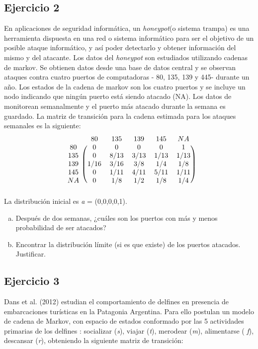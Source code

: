 \documentclass[12pt, a4paper]{article}
\begin{document}
\subsection*{Ejercicio 2}
En aplicaciones de seguridad informática, un \textit{honeypot}(o sistema trampa) es una herramienta dispuesta en una red o sistema informático para ser el objetivo de un posible ataque informático, y así poder detectarlo y obtener información del mismo y del atacante. Los datos del \textit{honeypot} son estudiados utilizando cadenas de markov. Se obtienen datos desde una base de datos central y se observan ataques contra cuatro puertos de computadoras - 80, 135, 139 y 445- durante un año. Los estados de la cadena de markov son los cuatro puertos y se incluye un nodo indicando que ningún puerto está siendo atacado (NA). Los datos de monitorean semanalmente y el puerto más atacado durante la semana es guardado. La matriz de transición para la cadena estimada para los ataques semanales es la siguiente:
 \[
\begin{blockarray}{cccccc}
 & 80 & 135 & 139 & 145 & NA \\
\begin{block}{c(ccccc)}
  80 & 0 & 0 & 0 & 0 & 1 \\
  135 & 0 & 8/13 & 3/13 & 1/13 & 1/13 \\
  139 & 1/16 & 3/16 & 3/8 & 1/4 & 1/8 \\
  145 & 0 & 1/11 & 4/11 & 5/11 & 1/11 \\
  NA & 0 & 1/8 & 1/2 & 1/8 & 1/4 \\
\end{block}
\end{blockarray}
 \]
La distribución inicial es \textit{a} =  (0,0,0,0,1).

\begin{enumerate}[(a)]
	\item Después de dos semanas, ¿cuáles son los puertos con más y menos probabilidad de ser atacados?
	\item Encontrar la distribución límite (si es que existe) de los puertos atacados. Justificar.
\end{enumerate}

\subsection*{Ejercicio 3}
Dans et al. (2012) estudian el comportamiento de delfines en presencia de embarcaciones turísticas en la Patagonia Argentina. Para ello postulan un modelo de cadena de Markov, con espacio de estados conformado por las 5 actividades primarias de los delfines : socializar (\textit{s}), viajar (\textit{t}), merodear (\textit{m}), alimentarse ( \textit{f}), descansar (\textit{r}), obteniendo la siguiente matriz de transición:
\end{document}
